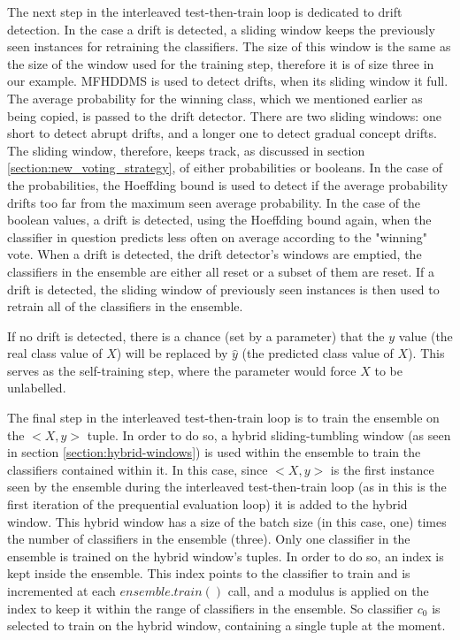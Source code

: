 The next step in the interleaved test-then-train loop is dedicated to drift detection. In the case a drift is detected, a sliding window keeps the previously seen instances for retraining the classifiers. The size of this window is the same as the size of the window used for the training step, therefore it is of size three in our example. MFHDDMS is used to detect drifts, when its sliding window it full. The average probability for the winning class, which we mentioned earlier as being copied, is passed to the drift detector. There are two sliding windows: one short to detect abrupt drifts, and a longer one to detect gradual concept drifts. The sliding window, therefore, keeps track, as discussed in section \ref{section:new_voting_strategy}, of either probabilities or booleans. In the case of the probabilities, the Hoeffding bound is used to detect if the average probability drifts too far from the maximum seen average probability. In the case of the boolean values, a drift is detected, using the Hoeffding bound again, when the classifier in question predicts less often on average according to the "winning" vote.
When a drift is detected, the drift detector's windows are emptied, the classifiers in the ensemble are either all reset or a subset of them are reset. 
If a drift is detected, the sliding window of previously seen instances is then used to retrain all of the classifiers in the ensemble.

If no drift is detected, there is a chance (set by a parameter) that the $y$ value (the real class value of $X$) will be replaced by $\hat y$ (the predicted class value of $X$). This serves as the self-training step, where the parameter would force $X$ to be unlabelled.

The final step in the interleaved test-then-train loop is to train the ensemble on the $<X, y>$ tuple. In order to do so, a hybrid sliding-tumbling window (as seen in section \ref{section:hybrid-windows}) is used within the ensemble to train the classifiers contained within it. In this case, since $<X, y>$ is the first instance seen by the ensemble during the interleaved test-then-train loop (as in this is the first iteration of the prequential evaluation loop) it is added to the hybrid window. This hybrid window has a size of the batch size (in this case, one) times the number of classifiers in the ensemble (three). 
Only one classifier in the ensemble is trained on the hybrid window's tuples. In order to do so, an index is kept inside the ensemble. This index points to the classifier to train and is incremented at each $ensemble.train()$ call, and a modulus is applied on the index to keep it within the range of classifiers in the ensemble.
So classifier $c_0$ is selected to train on the hybrid window, containing a single tuple at the moment.

